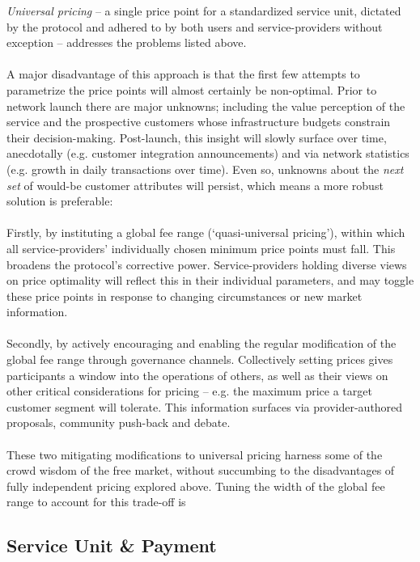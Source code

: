 \documentclass[longbibliography,nofootinbib]{revtex4-1}
\begin{document}
\textit{Universal pricing} – a single price point for a standardized service unit, dictated by the protocol and adhered to by both users and service-providers without exception – addresses the problems listed above. 
\\\\
A major disadvantage of this approach is that the first few attempts to parametrize the price points will almost certainly be non-optimal. Prior to network launch there are major unknowns; including the value perception of the service and the prospective customers whose infrastructure budgets constrain their decision-making. Post-launch, this insight will slowly surface over time, anecdotally (e.g. customer integration announcements) and via network statistics (e.g. growth in daily transactions over time). Even so, unknowns about the \textit{next set} of would-be customer attributes will persist, which means a more robust solution is preferable: 
\\\\
Firstly, by instituting a global fee range (‘quasi-universal pricing’), within which all service-providers’ individually chosen minimum price points must fall. This broadens the protocol's corrective power. Service-providers holding diverse views on price optimality will reflect this in their individual parameters, and may toggle these price points in response to changing circumstances or new market information.
\\\\
Secondly, by actively encouraging and enabling the regular modification of the global fee range through governance channels. Collectively setting prices gives participants a window into the operations of others, as well as their views on other critical considerations for pricing – e.g. the maximum price a target customer segment will tolerate. This information surfaces via provider-authored proposals, community push-back and debate. 
\\\\
These two mitigating modifications to universal pricing harness some of the crowd wisdom of the free market, without succumbing to the disadvantages of fully independent pricing explored above. Tuning the width of the global fee range to account for this trade-off is 

\subsection{Service Unit \& Payment}
\end{document}
